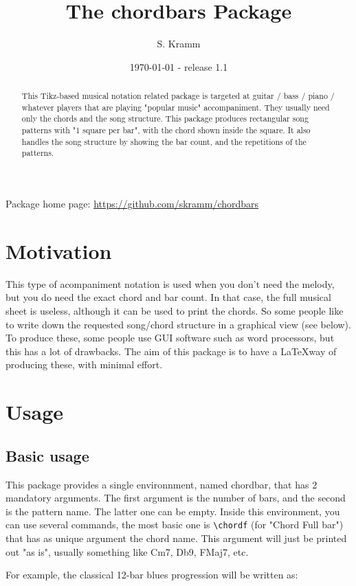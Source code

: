 \documentclass[11pt]{article}
\title{The chordbars Package}
\author{S. Kramm}
\date{\today {} - release 1.1}
\begin{document}
\maketitle

\begin{abstract}
This Tikz-based musical notation related package is targeted at guitar / bass / piano / whatever players that are playing "popular music" accompaniment.
They usually need only the chords and the song structure.
This package produces rectangular song patterns with "1 square per bar", with the chord shown inside the square.
It also handles the song structure by showing the bar count, and the repetitions of the patterns.
\end{abstract}

Package home page: \url{https://github.com/skramm/chordbars}

\section{Motivation}

This type of acompaniment notation is used when you don't need the melody, but you do need the exact chord and bar count.
In that case, the full musical sheet is useless, although it can be used to print the chords.
So some people like to write down the requested song/chord structure in a graphical view (see below).
To produce these, some people use GUI software such as word processors, but this has a lot of drawbacks.
The aim of this package is to have a \LaTeX way of producing these, with minimal effort.


\section{Usage}
\subsection{Basic usage}
This package provides a single environnment, named {\ttfamily chordbar}, that has 2 mandatory arguments.
The first argument is the number of bars, and the second is the pattern name.
The latter one can be empty.
Inside this environment, you can use several commands, the most basic one is 
\verb|\chordf| (for "Chord Full bar") that has as unique argument the chord name.
This argument will just be printed out "as is", usually something like Cm7, Db9, FMaj7, etc.

For example, the classical 12-bar blues progression will be written as:
\end{document}
